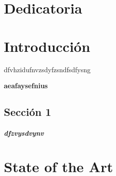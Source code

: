 \documentclass[12pt]{report} %
\begin{document}
\chapter*{Dedicatoria} %

\setcounter{page}{5}
	
		
	\vfill
	
	\newpage %
	\thispagestyle{empty}
	\mbox{}
	


\tableofcontents
\thispagestyle{fancy}

\newpage %
\thispagestyle{empty}
\mbox{}

\listoffigures
\thispagestyle{fancy}

\newpage %
\thispagestyle{empty}
\mbox{}

\listoftables
\thispagestyle{fancy}

\newpage %
\thispagestyle{empty}
\mbox{}


\clearpage
{} %

\chapter{Introducción}

dfvhzidufnvzsdyfzsndfsdfysng

\textbf{aeafaysefnius}

\section{Sección 1}

\paragraph{dfzvysdvynv}


\chapter{State of the Art}
\end{document}
